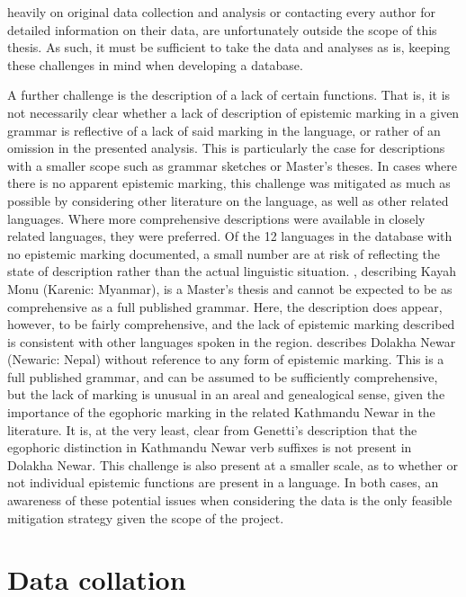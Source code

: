 heavily on original data collection and analysis or contacting every author for detailed information on their data, are unfortunately outside the scope of this thesis. As such, it must be sufficient to take the data and analyses as is, keeping these challenges in mind when developing a database.

A further challenge is the description of a lack of certain functions. That is, it is not necessarily clear whether a lack of description of epistemic marking in a given grammar is reflective of a lack of said marking in the language, or rather of an omission in the presented analysis. This is particularly the case for descriptions with a smaller scope such as grammar sketches or Master's theses. In cases where there is no apparent epistemic marking, this challenge was mitigated as much as possible by considering other literature on the language, as well as other related languages. Where more comprehensive descriptions were available in closely related languages, they were preferred. Of the 12 languages in the database with no epistemic marking documented, a small number are at risk of reflecting the state of description rather than the actual linguistic situation. , describing Kayah Monu (Karenic: Myanmar), is a Master's thesis and cannot be expected to be as comprehensive as a full published grammar. Here, the description does appear, however, to be fairly comprehensive, and the lack of epistemic marking described is consistent with other languages spoken in the region.  describes Dolakha Newar (Newaric: Nepal) without reference to any form of epistemic marking. This is a full published grammar, and can be assumed to be sufficiently comprehensive, but the lack of marking is unusual in an areal and genealogical sense, given the importance of the egophoric marking in the related Kathmandu Newar in the literature. It is, at the very least, clear from Genetti's description that the egophoric distinction in Kathmandu Newar verb suffixes is not present in Dolakha Newar. This challenge   is also present at a smaller scale, as to whether or not individual epistemic functions are present in a language. In both cases, an awareness of these potential issues when considering the data is the only feasible mitigation strategy given the scope of the project. 

\section{Data collation}\label{s:Methods:Schema}
